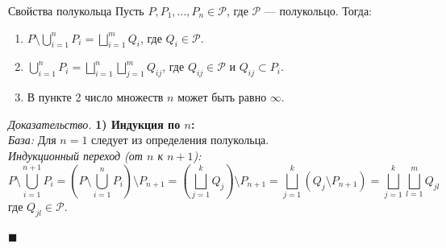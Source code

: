 \documentclass[12pt,a4paper]{article}
\newenvironment{Proof}[1][Доказательство]{\vspace{0.5em}\noindent\textit{#1.}\hspace{0.5em}\ignorespaces}{\hfill$\blacksquare$\vspace{1em}}
\begin{document}
\begin{Theorem}{Свойства полукольца}{}
Пусть $P, P_1, \dots, P_n \in \mathcal{P}$, где $\mathcal{P}$ — полукольцо. Тогда:
\begin{enumerate}
    \item $P \setminus \bigcup\limits_{i=1}^n P_i = \bigsqcup\limits_{i=1}^m Q_i$, где $Q_i \in \mathcal{P}$.
    \item $\bigcup\limits_{i=1}^n P_i = \bigsqcup\limits_{i=1}^n \bigsqcup\limits_{j=1}^m Q_{ij}$, где $Q_{ij} \in \mathcal{P}$ и $Q_{ij} \subset P_i$.
    \item В пункте 2 число множеств $n$ может быть равно $\infty$.
\end{enumerate}
\end{Theorem}

\begin{Proof}
\textbf{1) Индукция по $n$:} \\
\textit{База:} Для $n=1$ следует из определения полукольца. \\
\textit{Индукционный переход (от $n$ к $n+1$):}
$$ P \setminus \bigcup_{i=1}^{n+1} P_i = \left( P \setminus \bigcup_{i=1}^n P_i \right) \setminus P_{n+1} = \left( \bigsqcup_{j=1}^k Q_j \right) \setminus P_{n+1} = \bigsqcup_{j=1}^k (Q_j \setminus P_{n+1}) = \bigsqcup_{j=1}^k \bigsqcup_{l=1}^m Q_{jl} $$
где $Q_{jl} \in \mathcal{P}$.

\begin{center}
\end{center}
\end{Proof}
\end{document}
